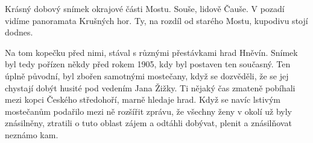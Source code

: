 
Krásný dobový snímek okrajové části Mostu. Souše, lidově Čauše. V
pozadí vidíme panoramata Krušných hor. Ty, na rozdíl od starého Mostu,
kupodivu stojí dodnes.

Na tom kopečku před nimi, stával s různými přestávkami hrad Hněvín.
Snímek byl tedy pořízen někdy před rokem 1905, kdy byl postaven ten
současný. Ten úplně původní, byl zbořen samotnými mostečany, když se
dozvěděli, že se jej chystají dobýt husité pod vedením Jana Žižky. Ti
nějaký čas zmateně pobíhali mezi kopci Českého středohoří, marně
hledaje hrad. Když se navíc lstivým mostečanům podařilo mezi ně
rozšířit zprávu, že všechny ženy v okolí už byly znásilněny, ztratili
o tuto oblast zájem a odtáhli dobývat, plenit a znásilňovat neznámo
kam.
